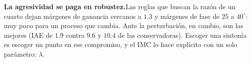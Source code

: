 
\begin{ideaclave}
\textbf{La agresividad se paga en robustez.}\enspace Las reglas que buscan la razón de un cuarto dejan márgenes de ganancia cercanos a $1.3$ y márgenes de fase de $25$ a $40^\circ$: muy poco para un proceso que cambia. Ante la perturbación, en cambio, son las mejores (IAE de $1.9$ contra $9.6$ y $10.4$ de las conservadoras). Escoger una sintonía es escoger un punto en ese compromiso, y el IMC lo hace explícito con un solo parámetro: $\lambda$.
\end{ideaclave}
